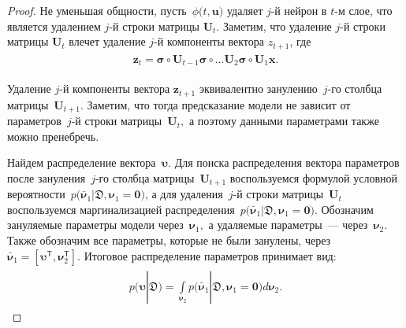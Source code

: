 \documentclass[12pt]{a&t}
\begin{document}
\begin{proof}
Не уменьшая общности, пусть~$\phi\bigr(t, \mathbf{u}\bigr)$ удаляет $j$-й нейрон в $t$-м слое, что является удалением $j$-й строки матрицы $\mathbf{U}_t$. Заметим, что удаление $j$-й строки матрицы $\mathbf{U}_t$ влечет удаление $j$-й компоненты вектора $z_{t+1}$, где
\begin{gather}
\label{eq:ap:tr:neural:1}
\begin{aligned}
\mathbf{z}_{t} = \bm{\sigma} \circ \mathbf{U}_{t-1} \bm{\sigma} \circ \ldots  \mathbf{U}_2\bm{\sigma} \circ \mathbf{U}_1\mathbf{x}.
\end{aligned}
\end{gather}

Удаление $j$-й компоненты вектора $\mathbf{z}_{t+1}$ эквивалентно занулению~$j$-го столбца матрицы~$\mathbf{U}_{t+1}.$ Заметим, что тогда предсказание модели не зависит от параметров~$j$-й строки матрицы~$\mathbf{U}_t,$ а поэтому данными параметрами также можно пренебречь.

Найдем распределение вектора~$\bm{\upsilon}.$ Для поиска распределения вектора параметров после зануления~$j$-го столбца матрицы~$\mathbf{U}_{t+1}$ воспользуемся формулой условной вероятности~$p\bigr(\bar{\bm{\nu}}_1|\mathfrak{D}, \bm{\nu}_1=\mathbf{0}\bigr)$, а для удаления~$j$-й строки матрицы~$\mathbf{U}_{t}$ воспользуемся маргинализацией распределения~$p\bigr(\bar{\bm{\nu}}_1|\mathfrak{D}, \bm{\nu}_1=\mathbf{0}\bigr)$. Обозначим зануляемые параметры модели через~$\bm{\nu}_1,$ а удаляемые параметры~--- через~$\bm{\nu}_2.$ Также обозначим все параметры, которые не были занулены, через~$\bar{\bm{\nu}}_1 = [\bm{\upsilon}^{\mathsf{T}}, \bm{\nu}_2^{\mathsf{T}}].$ Итоговое распределение параметров принимает  вид:
\begin{gather}
\label{eq:ap:tr:1:1}
\begin{aligned}
p\bigr(\bm{\upsilon}|\mathfrak{D}\bigr)  = \int\limits_{\bm{\nu}_2}p\bigr(\bar{\bm{\nu}}_1|\mathfrak{D}, \bm{\nu}_1=\mathbf{0}\bigr) d\bm{\nu}_2.
\end{aligned}
\end{gather}


\end{proof}
\end{document}
